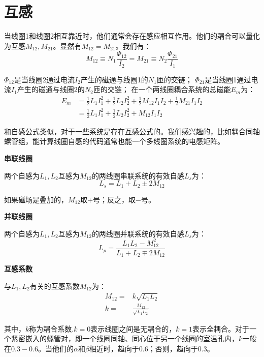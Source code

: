 \section{互感}
当线圈1和线圈2相互靠近时，他们通常会存在感应相互作用。他们的耦合可以量化为互感$M_{12},M_{21}$。显然有$M_{12}=M_{21}$。我们有：
\begin{equation}
M_{12}\equiv N_1\frac{\Phi_{12}}{I_2}=M_{21}\equiv N_2\frac{\Phi_{21}}{I_1}%
\end{equation}

$\Phi_{12}$是当线圈2通过电流$I_2$产生的磁通与线圈1的$N_1$匝的交链；
$\Phi_{21}$是当线圈1通过电流$I_1$产生的磁通与线圈2的$N_2$匝的交链；
在一个两线圈耦合系统的总磁能$E_m$为：
\begin{equation}
\begin{split}
E_m&=\frac{1}{2}L_1I_1^2+\frac{1}{2}L_2I_2^2+\frac{1}{2}M_{12}I_1I_2+\frac{1}{2}M_{21}I_1I_2\\
&= \frac{1}{2}L_1I_1^2+\frac{1}{2}L_2I_2^2+M_{12}I_1I_2%
\end{split}
\end{equation}

和自感公式类似，对于一些系统是存在互感公式的。我们感兴趣的，比如耦合同轴螺管组，能计算线圈自感的代码通常也能一个多线圈系统的电感矩阵。

\textbf{串联线圈} 
  
  两个自感为$L_1,L_2$互感为$M_{12}$的两线圈串联系统的有效自感$L_s$为：
  \begin{equation}
   L_s=L_1+L_2 \pm 2M_{12}%
  \end{equation}

如果磁场是叠加的，$M_{12}$取+号；反之，取−号。

\textbf{并联线圈} 

两个自感为$L_1,L_2$互感为$M_{12}$的两线圈并联系统的有效自感$L_s$为：
  \begin{equation}
L_p=\frac{L_1 L_2-M_{12}^2}{L_1+L_2 \mp 2M_{12}}%
\end{equation}

\textbf{互感系数} 

  与$L_1,L_2$有关的互感系数$M_{12}$为：
\begin{subequations}
	\begin{align}
M_{12}=&k\sqrt{L_1L_2}\\%
k=&\frac{M_{12}}{\sqrt{L_1L_2}}%
	\end{align}
\end{subequations}

其中，$k$称为耦合系数.$k=0$表示线圈之间是无耦合的，$k=1$表示全耦合。对于一个紧密嵌入的螺管对，即一个线圈同轴、同心位于另一个线圈的室温孔内，$k$一般在$0.3-0.6$。当他们的$\alpha$和$\beta$相近时，趋向于0.6；否则，趋向于0.3。



